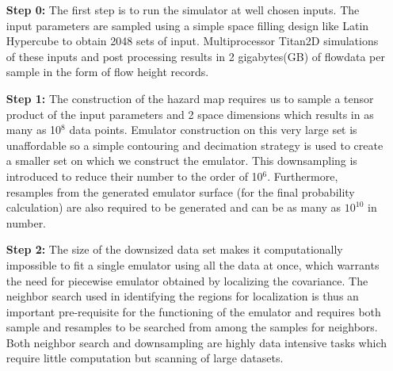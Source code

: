 \documentclass{acm_proc_article-sp}
\begin{document}
\begin{enumerate}
\vspace{-0.2in}
\item [ {\bf Step 0:}] The first step is to run the simulator at well chosen inputs. The input parameters
are sampled using a simple space filling design like Latin Hypercube to obtain  2048 sets of input.
Multiprocessor Titan2D  simulations of these inputs  and post processing results in 
2 gigabytes(GB) of flowdata per sample in the form of flow height records. 
\item [ {\bf Step 1:}] { The construction of the hazard map requires us to sample a tensor product of the input parameters and 2 space dimensions
which results in as many as 10$^{8}$ data points. Emulator construction on this very large set is unaffordable so a simple 
contouring and decimation strategy is used to create a smaller set on which we construct the emulator.
This 
downsampling is introduced to reduce their number to the order of 10$^{6}$. Furthermore, 
resamples from the generated emulator surface (for the final probability calculation) are also required to be generated and can be as many as $10^{10}$ in number.}

\item [ {\bf Step 2:}]The size of the downsized  data set makes it computationally impossible to fit a single emulator using all the data 
at once, which warrants the need for piecewise emulator obtained by localizing the covariance. The
neighbor search used in identifying the regions for localization is thus an important pre-requisite for the functioning of the
emulator and requires both sample and resamples to be searched from among the samples for neighbors. Both neighbor search and downsampling
are highly data intensive tasks which require little computation but scanning of large datasets.


\end{enumerate}
\end{document}
